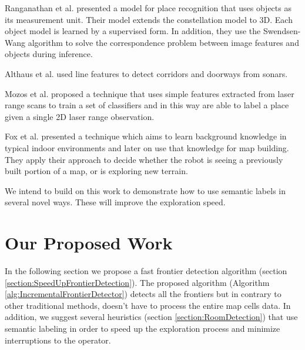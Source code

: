 \documentclass[a4paper,10pt]{article}
\begin{document}
Ranganathan et al. \cite{ranganathan_semantic_2007} presented a model for place
recognition that uses objects as its measurement unit. Their model extends
the constellation model to 3D. Each object model is learned by a supervised form.
In addition, they use the Swendsen-Wang algorithm \cite{barbu_generalizing_2005}
to solve the correspondence problem between image features and objects during inference.

Althaus et al. \cite{althaus_behavior_2003} used line features to detect
corridors and doorways from sonars.


Mozos et al. \cite{martinez2005icra} proposed a technique that uses simple
features extracted from laser range scans to train a set of classifiers and in
this way are able to label a place given a single 2D laser range observation.

Fox et al. \cite{fox2005hierarchical} presented a technique which aims to
learn background knowledge in typical indoor environments and later on use that
knowledge for map building. They apply their approach to decide whether the
robot is seeing a previously built portion of a map, or is exploring new
terrain.

We intend to build on this work to demonstrate how to use semantic labels in
several novel ways. These will improve the exploration speed.

\section{Our Proposed Work}

In the following section we propose a fast frontier detection algorithm
(section \ref{section:SpeedUpFrontierDetection}). The proposed algorithm (Algorithm
\ref{alg:IncrementalFrontierDetector}) detects all the frontiers but in
contrary to other traditional methods, doesn't have to process the entire map
cells data.
In addition, we suggest several heuristics (section \ref{section:RoomDetection})
that use semantic labeling in order to speed up the exploration process and
minimize interruptions to the operator.
\end{document}
